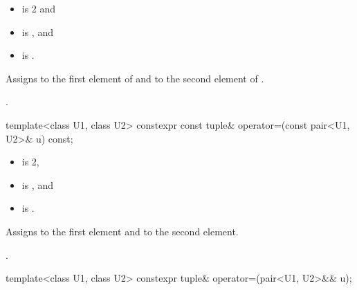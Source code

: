 \documentclass{wg21}
\begin{document}
\begin{itemdescr}
    \pnum
    \constraints
    \begin{itemize}
        \item {} is 2 and
        \item {} is , and
        \item {} is .
    \end{itemize}
    
    \pnum
    \effects
    Assigns  to the first element of 
    and  to the second element of .
    
    \pnum
    \returns
    .
\end{itemdescr}

%
\begin{itemdecl}
    template<class U1, class U2> constexpr const tuple& operator=(const pair<U1, U2>& u) const;
\end{itemdecl}

\begin{itemdescr}
    \pnum
    \constraints
    \begin{itemize}
        \item
         is 2,
        \item
         is , and
        \item
         is .
    \end{itemize}
    
    \pnum
    \effects
    Assigns  to the first element and
     to the second element.
    
    \pnum
    \returns
    .
\end{itemdescr}

%
%
\begin{itemdecl}
    template<class U1, class U2> constexpr tuple& operator=(pair<U1, U2>&& u);
\end{itemdecl}
\end{document}
